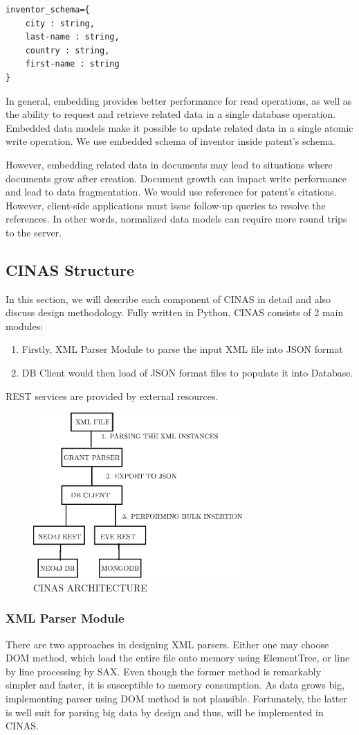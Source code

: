 \documentclass{sig-alternate}
\begin{document}
{\begin{lstlisting}[caption=Document-oriented schema]
inventor_schema={
    city : string, 
    last-name : string, 
    country : string, 
    first-name : string
}
\end{lstlisting}

In general, embedding provides better performance for read operations, as well as the ability to request and retrieve related data in a single database operation. Embedded data models make it possible to update related data in a single atomic write operation. We use embedded schema of inventor inside patent's schema.

However, embedding related data in documents may lead to situations where documents grow after creation. Document growth can impact write performance and lead to data fragmentation. We would use reference for patent's citations. However, client-side applications must issue follow-up queries to resolve the references. In other words, normalized data models can require more round trips to the server.


\subsection{CINAS Structure}
In this section, we will describe each component of CINAS in detail and also discuss design methodology. Fully written in Python, CINAS consists of 2 main modules:
\begin{enumerate}
 \item Firstly, XML Parser Module to parse the input XML file into JSON format
 \item DB Client would then load of JSON format files to populate it into Database.
\end{enumerate}
REST services are provided by external resources.
\begin{figure}[htb]
\centering
\includegraphics[width=80mm,scale=0.1]{cinasstruct.eps}
\caption{ CINAS ARCHITECTURE}
\end{figure}
\subsubsection{XML Parser Module}
There are two approaches in designing XML parsers. Either one may choose DOM method, which load the entire file onto memory using ElementTree, or line by line processing by SAX. Even though the former method is remarkably simpler and faster, it is susceptible to memory consumption. As data grows big, implementing parser using DOM method is not plausible. Fortunately, the latter is well suit for parsing big data by design and thus, will be implemented in CINAS.

}
\end{document}
